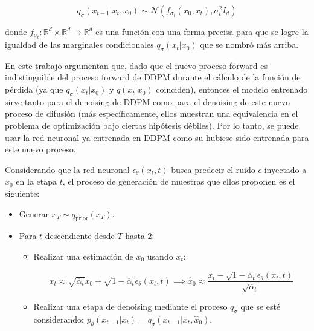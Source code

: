 \begin{equation}
    q_\sigma(x_{t-1}|x_t,x_0)\sim\mathcal{N}\left(f_{\sigma_t}(x_0,x_t),\sigma_t^2 I_d\right)
\end{equation}

donde $f_{\sigma_t}:\mathbb{R}^d\times\mathbb{R}^d\to\mathbb{R}^d$ es una función con una forma precisa  para que se logre la igualdad de las marginales condicionales $q_\sigma(x_t|x_0)$ que se nombró más arriba.

En este trabajo argumentan que, dado que el nuevo proceso forward es indistinguible del proceso forward de DDPM durante el cálculo de la función de pérdida (ya que $q_\sigma(x_t|x_0)$ y $q(x_t|x_0)$ coinciden), entonces el modelo entrenado sirve tanto para el denoising de DDPM como para el denoising de este nuevo proceso de difusión (más específicamente, ellos muestran una equivalencia en el problema de optimización bajo ciertas hipótesis débiles). Por lo tanto, se puede usar la red neuronal ya entrenada en DDPM como su hubiese sido entrenada para este nuevo proceso.

Considerando que la red neuronal $\epsilon_\theta(x_t,t)$ busca predecir el ruido $\epsilon$ inyectado a $x_0$ en la etapa $t$, el proceso de generación de muestras que ellos proponen es el siguiente:

\begin{itemize}
    \item Generar $x_T\sim q_{\text{prior}}(x_T)$.
    \item Para $t$ descendiente desde $T$ hasta $2$:
          \begin{itemize}
              \item Realizar una estimación de $x_0$ usando $x_t$:

                    \begin{equation}
                        x_t \approx \sqrt{\overline{\alpha}_t}x_0 + \sqrt{1-\overline{\alpha}_t}\epsilon_\theta(x_t,t) \implies \hat{x}_0 \approx \frac{x_t - \sqrt{1-\overline{\alpha}_t}\epsilon_\theta(x_t,t)}{\sqrt{\overline{\alpha}_t}}
                    \end{equation}

              \item Realizar una etapa de denoising mediante el proceso $q_\sigma$ que se esté considerando: $p_\theta(x_{t-1}|x_t) = q_\sigma(x_{t-1}|x_t,\hat{x}_0)$.
          \end{itemize}
\end{itemize}

